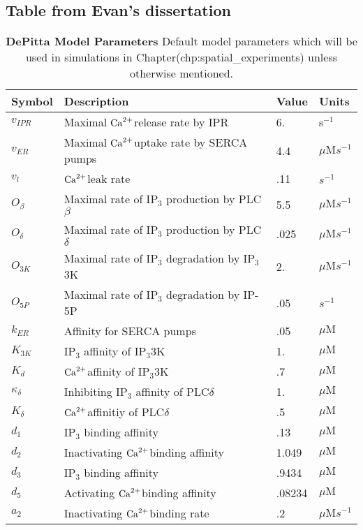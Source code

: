 \documentclass[11pt]{article}
\newcommand{\ca}{$\rm{Ca}^{2+}$}
\begin{document}
\subsection{Table from Evan's dissertation}
\begin{table}
\centering
\begin{tabular}{ |l|l|l|l| }
\hline
Symbol & Description & Value & Units       \\
\hline
  $v_{IPR}$         & Maximal \ca release rate by IPR   &   6. & s$^{-1}$    \\
  $v_{ER}$         & Maximal \ca uptake rate by SERCA pumps  &   4.4 &  $\mu\mathrm{M}s^{-1}$    \\
  $v_l$         & \ca leak rate  &   .11   & $s^{-1}$ \\
  $O_\beta$         & Maximal rate of IP$_3$ production by PLC$\beta$  &   5.5  &   $\mu\mathrm{M}s^{-1}$  \\
  $O_\delta$    & Maximal rate of IP$_3$ production by PLC$\delta$  &   .025   &   $\mu\mathrm{M}s^{-1}$\\
  $O_{3K}$    & Maximal rate of IP$_3$ degradation by IP$_3$3K  &   2.   &  $\mu\mathrm{M}s^{-1}$ \\
  $O_{5P}$         & Maximal rate of IP$_3$ degradation by IP-5P  &   .05  & $s^{-1}$   \\
  $k_{ER}$      &  Affinity for SERCA pumps &   .05   &   $\mu\mathrm{M}$  \\
  $K_{3K}$      & IP$_3$ affinity of IP$_3$3K  &   1.&     $\mu\mathrm{M}$  \\
  $K_d$      & \ca affinity of IP$_3$3K   &   .7     &   $\mu\mathrm{M}$ \\
  $\kappa_\delta$      & Inhibiting IP$_3$ affinity of PLC$\delta$  &   1. &   $\mu\mathrm{M}$   \\
  $K_\delta$      & \ca affinitiy of PLC$\delta$  &   .5 &  $\mu\mathrm{M}$    \\
  $d_1$      & IP$_3$ binding affinity   &   .13     &$\mu\mathrm{M}$  \\
  $d_2$      & Inactivating \ca binding affinity  &   1.049  &  $\mu\mathrm{M}$   \\
  $d_3$      & IP$_3$ binding affinity  &   .9434    &  $\mu\mathrm{M}$  \\
  $d_5$      & Activating \ca binding affinity  &   .08234    & $\mu\mathrm{M}$  \\
  $a_2$      & Inactivating \ca binding rate  &   .2     & $\mu\mathrm{M}s^{-1}$  \\
  \hline
\end{tabular}
\caption{\textbf{DePitta Model Parameters} Default model parameters which will be used in simulations in Chapter(chp:spatial\_experiments) unless otherwise mentioned.}
\end{table}
\end{document}
